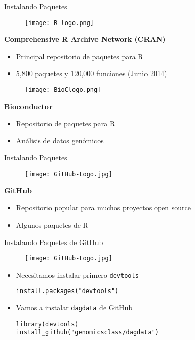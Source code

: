 \documentclass{beamer}
\begin{document}
\begin{frame}[fragile]{Instalando Paquetes}
\begin{figure}[H]
\centering
\texttt{[image: R-logo.png]}
\end{figure}
\textbf{Comprehensive R Archive Network (CRAN)}
\begin{itemize}
\item Principal repositorio de paquetes para R
\item 5,800 paquetes y 120,000 funciones (Junio 2014)
\end{itemize}
\begin{figure}[H]
\centering
\texttt{[image: BioClogo.png]}
\end{figure}
\textbf{Bioconductor}
\begin{itemize}
\item Repositorio de paquetes para R
\item Análisis de datos genómicos
\end{itemize}
\end{frame}

\begin{frame}{Instalando Paquetes}
\begin{figure}[H]
\centering
\texttt{[image: GitHub-Logo.jpg]}
\end{figure}
\textbf{GitHub}
\begin{itemize}
\item Repositorio popular para muchos proyectos open source
\item Algunos paquetes de R
\end{itemize}
\end{frame}


\begin{frame}[fragile]{Instalando Paquetes de GitHub}
\begin{figure}[H]
\centering
\texttt{[image: GitHub-Logo.jpg]}
\end{figure}
\begin{itemize}
\item Necesitamos instalar primero \texttt{devtools}
\begin{verbatim}
install.packages("devtools")
\end{verbatim}
\item Vamos a instalar \texttt{dagdata} de GitHub
\begin{verbatim}
library(devtools)
install_github("genomicsclass/dagdata")
\end{verbatim}
\end{itemize}
\end{frame}
\end{document}
